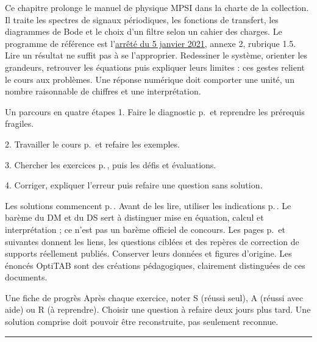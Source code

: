 \thispagestyle{mpsiFront}
Ce chapitre prolonge le manuel de physique MPSI dans la charte de la collection. Il traite les spectres de signaux périodiques, les fonctions de transfert, les diagrammes de Bode et le choix d’un filtre selon un cahier des charges. Le programme de référence est l’\href{https://www.education.gouv.fr/bo/21/Special1/ESRS2035779A.htm}{arrêté du 5 janvier 2021}, annexe 2, rubrique 1.5.
Lire un résultat ne suffit pas à se l’approprier. Redessiner le système, orienter les grandeurs, retrouver les équations puis expliquer leurs limites : ces gestes relient le cours aux problèmes. Une réponse numérique doit comporter une unité, un nombre raisonnable de chiffres et une interprétation.
\begin{loi}{Un parcours en quatre étapes}
1. Faire le diagnostic p.\,\pageref{diagnostic} et reprendre les prérequis fragiles.\par
2. Travailler le cours p.\,\pageref{cours-1} et refaire les exemples.\par
3. Chercher les exercices p.\,\pageref{td1}, puis les défis et évaluations.\par
4. Corriger, expliquer l’erreur puis refaire une question sans solution.
\end{loi}
Les solutions commencent p.\,\pageref{corr-diag}. Avant de les lire, utiliser les indications p.\,\pageref{indices}. Le barème du DM et du DS sert à distinguer mise en équation, calcul et interprétation ; ce n’est pas un barème officiel de concours.
Les pages p.\,\pageref{sources-1} et suivantes donnent les liens, les questions ciblées et des repères de correction de supports réellement publiés. Conserver leurs données et figures d’origine. Les énoncés OptiTAB sont des créations pédagogiques, clairement distinguées de ces documents.
\begin{methode}{Une fiche de progrès}
Après chaque exercice, noter S (réussi seul), A (réussi avec aide) ou R (à reprendre). Choisir une question à refaire deux jours plus tard. Une solution comprise doit pouvoir être reconstruite, pas seulement reconnue.
\end{methode}


\thispagestyle{mpsiFront}
\begingroup\setlength{\parskip}{0pt}\fontsize{10}{13.5}\selectfont
{}

\endgroup
\vspace{2mm}\hrule\vspace{2mm}


